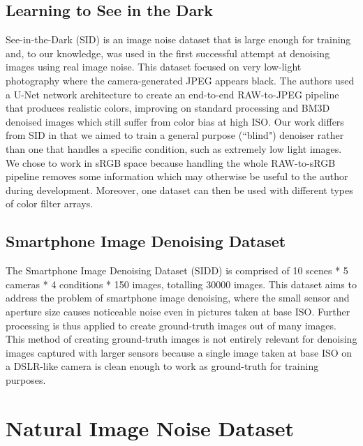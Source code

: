 \subsection{Learning to See in the Dark}
See-in-the-Dark (SID) \cite{learningtoseeinthedark} is an image noise dataset that is large enough for training and, to our knowledge, was used in the first successful attempt at denoising images using real image noise. This dataset focused on very low-light photography where the camera-generated JPEG appears black. The authors used a U-Net network architecture to create an end-to-end RAW-to-JPEG pipeline that produces realistic colors, improving on standard processing and BM3D denoised images which still suffer from color bias at high ISO. Our work differs from SID in that we aimed to train a general purpose (``blind") denoiser rather than one that handles a specific condition, such as extremely low light images. We chose to work in sRGB space because handling the whole RAW-to-sRGB pipeline removes some information which may otherwise be useful to the author during development. Moreover, one dataset can then be used with different types of color filter arrays.
\subsection{Smartphone Image Denoising Dataset}
The Smartphone Image Denoising Dataset (SIDD) \cite{sidd} is comprised of 10 scenes * 5 cameras * 4 conditions * 150 images, totalling 30000 images. This dataset aims to address the problem of smartphone image denoising, where the small sensor and aperture size causes noticeable noise even in pictures taken at base ISO. Further processing is thus applied to create ground-truth images out of many images. This method of creating ground-truth images is not entirely relevant for denoising images captured with larger sensors because a single image taken at base ISO on a DSLR-like camera is clean enough to work as ground-truth for training purposes.
%
\section{Natural Image Noise Dataset}\label{sec:Natural Image Noise Dataset}

